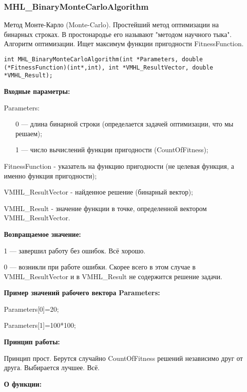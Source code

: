 \documentclass[a4paper,12pt]{article}
\begin{document}
\subsubsection{MHL\_BinaryMonteCarloAlgorithm}\label{MHL_BinaryMonteCarloAlgorithm}

Метод Монте-Карло (Monte-Carlo). Простейший метод оптимизации на бинарных строках. В простонародье его называют "методом научного тыка". Алгоритм оптимизации. Ищет максимум функции пригодности FitnessFunction.


\begin{lstlisting}[label=code_syntax_MHL_BinaryMonteCarloAlgorithm,caption=Синтаксис]
int MHL_BinaryMonteCarloAlgorithm(int *Parameters, double (*FitnessFunction)(int*,int), int *VMHL_ResultVector, double *VMHL_Result);
\end{lstlisting}

\textbf{Входные параметры:}

 Parameters:
 
 \begin{itemize}
 \item [0] --- длина бинарной строки (определается задачей оптимизации, что мы решаем);
 \item [1] --- число вычислений функции пригодности (CountOfFitness);
 \end{itemize}
  
 FitnessFunction - указатель на функцию пригодности (не целевая функция, а именно функция пригодности);
 
 VMHL\_ResultVector - найденное решение (бинарный вектор);
 
 VMHL\_Result - значение функции в точке, определенной вектором VMHL\_ResultVector.

\textbf{Возвращаемое значение:}
 
 1 --- завершил работу без ошибок. Всё хорошо.
 
 0 --- возникли при работе ошибки. Скорее всего в этом случае в VMHL\_ResultVector и в VMHL\_Result не содержится решение задачи.
 
\textbf{Пример значений рабочего вектора Parameters:}

 Parameters[0]=20;
 
 Parameters[1]=100*100;
 
 \textbf{Принцип работы:}
 
 Принцип прост. Берутся случайно CountOfFitness решений независимо друг от друга. Выбирается лучшее. Всё.
 
 \textbf{ О функции:}
 
\end{document}
